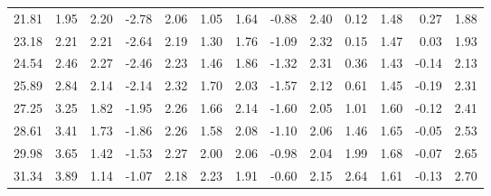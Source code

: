\documentclass{article}
\begin{document}
\begin{tabular}{rrrrrrrrrrrrr}
   21.81 &     1.95 &     2.20 &    -2.78 &     2.06  &     1.05 &     1.64 &    -0.88 &     2.40 &     0.12 &     1.48  &     0.27 &     1.88 \\ 
   23.18 &     2.21 &     2.21 &    -2.64 &     2.19  &     1.30 &     1.76 &    -1.09 &     2.32 &     0.15 &     1.47  &     0.03 &     1.93 \\ 
   24.54 &     2.46 &     2.27 &    -2.46 &     2.23  &     1.46 &     1.86 &    -1.32 &     2.31 &     0.36 &     1.43  &    -0.14 &     2.13 \\ 
   25.89 &     2.84 &     2.14 &    -2.14 &     2.32  &     1.70 &     2.03 &    -1.57 &     2.12 &     0.61 &     1.45  &    -0.19 &     2.31 \\ 
   27.25 &     3.25 &     1.82 &    -1.95 &     2.26  &     1.66 &     2.14 &    -1.60 &     2.05 &     1.01 &     1.60  &    -0.12 &     2.41 \\ 
   28.61 &     3.41 &     1.73 &    -1.86 &     2.26  &     1.58 &     2.08 &    -1.10 &     2.06 &     1.46 &     1.65  &    -0.05 &     2.53 \\ 
   29.98 &     3.65 &     1.42 &    -1.53 &     2.27  &     2.00 &     2.06 &    -0.98 &     2.04 &     1.99 &     1.68  &    -0.07 &     2.65 \\ 
   31.34 &     3.89 &     1.14 &    -1.07 &     2.18  &     2.23 &     1.91 &    -0.60 &     2.15 &     2.64 &     1.61  &    -0.13 &     2.70 \\ \hline 
\end{tabular}
\end{document}
